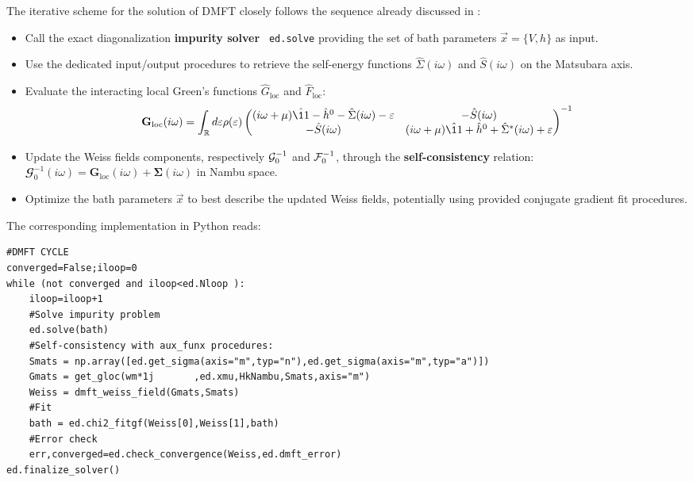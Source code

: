 \documentclass[edipack_sp.tex]{subfiles}
\begin{document}
The iterative scheme for the solution of DMFT closely follows the
sequence already discussed in :   
\begin{itemize}
\item Call the exact diagonalization {\bf impurity solver} {\tt
    ed.solve} providing the set of bath parameters $\vec{x}=\{V,h\}$  as input. 

\item Use the dedicated
  input/output \NAME procedures to retrieve the self-energy functions  
  $\hat{\Sigma}(i\omega)$ and $\hat{S}(i\omega)$ on the 
  Matsubara axis.
  
\item
  Evaluate the interacting local Green's functions $\hat{G}_\mathrm{loc}$ and
  $\hat{F}_\mathrm{loc}$:
  \begin{equation}
  {\mathbf G}_\mathrm{loc}(i\omega) =
  \int_\RRR d\e \rho(\e)
  \begin{pmatrix}
    (i\omega +\mu)\hat{\11} - \hat{h}^0 - \hat{\Sigma}(i\omega) -\e & -\hat{S}(i\omega) \\
    -\hat{S}(i\omega) & (i\omega +\mu)\hat{\11} + \hat{h}^0 +
    \hat{\Sigma}^*(i\omega) +\e\\
  \end{pmatrix}^{-1}
\end{equation}

\item Update the Weiss fields components, respectively 
  ${\cal G}_0^{-1}$ and ${\cal F}_0^{-1}$, through the {\bf self-con\-sis\-ten\-cy}
  relation: $\mathbfcal{G}^{-1}_0(i\omega) = {\mathbf G}_\mathrm{loc}(i\omega) +
  {\mathbf \Sigma}(i\omega)$ in Nambu space.
  
\item Optimize the bath parameters $\vec{x}$ to best describe the updated
    Weiss fields, potentially using \NAME provided conjugate gradient  fit
    procedures.
  \end{itemize}
%
The corresponding implementation in Python reads:
\begin{lstlisting}[style=mypython,numbers=none,basicstyle={\scriptsize\ttfamily}]
#DMFT CYCLE
converged=False;iloop=0
while (not converged and iloop<ed.Nloop ):
    iloop=iloop+1
    #Solve impurity problem
    ed.solve(bath)    
    #Self-consistency with aux_funx procedures:
    Smats = np.array([ed.get_sigma(axis="m",typ="n"),ed.get_sigma(axis="m",typ="a")])    
    Gmats = get_gloc(wm*1j       ,ed.xmu,HkNambu,Smats,axis="m") 
    Weiss = dmft_weiss_field(Gmats,Smats)                            
    #Fit
    bath = ed.chi2_fitgf(Weiss[0],Weiss[1],bath)
    #Error check
    err,converged=ed.check_convergence(Weiss,ed.dmft_error)
ed.finalize_solver()
\end{lstlisting}
\end{document}
